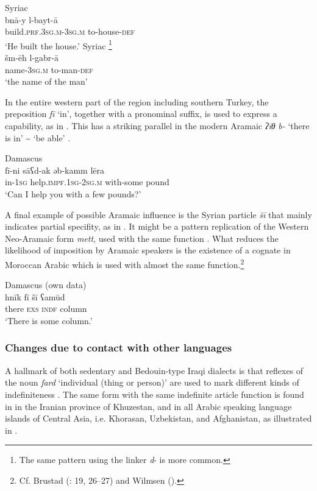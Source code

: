 \documentclass[output=paper]{langsci/langscibook}
\begin{document}
\ea \label{rubin}
\ea
{Syriac \citep[100]{Rubin2005}}\\
\gll bnā-y l-bayt-ā\\
     build.\textsc{prf.3sg.m}{}-3\textsc{sg.m} to-house-\textsc{def}\\
     \glt ‘He built the house.’
\ex
{ Syriac \citep[29]{Hopkins1997}\footnote{The same pattern using the linker \textit{d}{}- is more common.}}\\
\gll šm-ēh l-gabr-ā\\
     name-3\textsc{sg.m} to-man-\textsc{def}\\
\glt ‘the name of the man’
\z
\z

In the entire western part of the region including southern Turkey, the preposition \textit{fī} ‘in’, together with a pronominal suffix, is used to express a capability, as in . This has a striking parallel in the modern Aramaic \textit{ʔīθ} \textit{b-} ‘there is in' {\textasciitilde} `be able’ \citep[52]{Borg2004}.

\ea \label{cowell}
{Damascus \citep[415]{Cowell1964}} \\
\gll fī-ni sāʕd-ak əb-kamm lēra\\
     in-\textsc{1sg} help.\textsc{impf.1sg-2sg.m} with-some pound \\
\glt ‘Can I help you with a few pounds?’
\z

A final example of possible Aramaic influence is the Syrian particle \textit{šī} that mainly indicates partial specifity, as in . It might be a pattern replication of the Western Neo-Aramaic form \textit{mett}, used with the same function \citep[49]{Diem1979}. What reduces the likelihood of imposition by Aramaic speakers is the existence of a cognate in Moroccan Arabic which is used with almost the same function.\footnote{Cf. Brustad (\citeyear{Brustad2000}: 19, 26--27) and Wilmsen (\citeyear[51--53]{Wilmsen2014}).}

\ea\label{shi} 
{Damascus (own data)}\\
\gll hnīk fī šī ʕamūd\\
     there \textsc{exs} \textsc{indf} column \\
\glt ‘There is some column.’
\z

\subsubsection{Changes due to contact with other languages}
A hallmark of both sedentary and Bedouin-type Iraqi dialects is that reflexes of the noun \textit{fard} ‘individual (thing or person)’ are used to mark different kinds of indefiniteness \citep[118--119]{Blanc1964}. The same form with the same indefinite article function is found in in the Iranian province of Khuzestan, and in all Arabic speaking language islands of Central Asia, i.e. Khorasan, Uzbekistan, and Afghanistan, as illustrated in .
\end{document}
